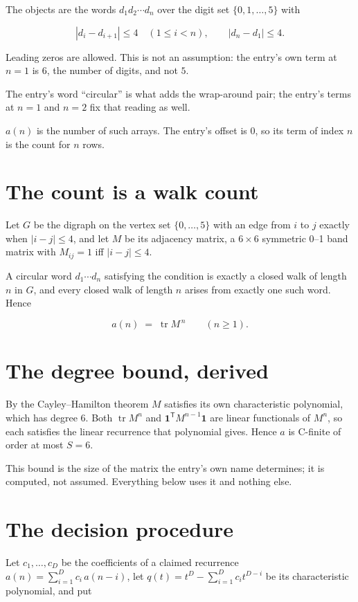 \documentclass[11pt]{article}
\theoremstyle{definition}
\begin{document}
The objects are the words $d_1 d_2 \cdots d_n$ over the digit set $\{0,1,\dots,5\}$ with

\[|d_i - d_{i+1}| \le 4\quad (1 \le i < n), \qquad |d_n - d_1| \le 4.\]

Leading zeros are allowed. This is not an assumption: the entry's own term at $n=1$ is $6$, the number of digits, and not $5$.

The entry's word ``circular'' is what adds the wrap-around pair; the entry's terms at $n = 1$ and $n = 2$ fix that reading as well.

$a(n)$ is the number of such arrays. The entry's offset is 0, so its term of index $n$ is the count for $n$ rows.

\section{The count is a walk count}

Let $G$ be the digraph on the vertex set $\{0,\dots,5\}$ with an edge from $i$ to $j$ exactly when $|i-j| \le 4$, and let $M$ be its adjacency matrix, a $6 \times 6$ symmetric 0--1 band matrix with $M_{ij} = 1$ iff $|i-j| \le 4$.

A circular word $d_1\cdots d_n$ satisfying the condition is exactly a closed walk of length $n$ in $G$, and every closed walk of length $n$ arises from exactly one such word. Hence

\[a(n) \;=\; \operatorname{tr} M^{\,n} \qquad (n \ge 1).\]

\section{The degree bound, derived}

By the Cayley--Hamilton theorem $M$ satisfies its own characteristic polynomial, which has degree $6$. Both $\operatorname{tr} M^n$ and $\mathbf 1^{\mathsf T} M^{n-1} \mathbf 1$ are linear functionals of $M^{n}$, so each satisfies the linear recurrence that polynomial gives. Hence $a$ is C-finite of order at most $S = 6$.

This bound is the size of the matrix the entry's own name determines; it is computed, not assumed. Everything below uses it and nothing else.

\section{The decision procedure}

Let $c_1,\dots,c_D$ be the coefficients of a claimed recurrence $a(n) = \sum_{i=1}^{D} c_i\,a(n-i)$, let $q(t) = t^{D} - \sum_{i=1}^{D} c_i t^{D-i}$ be its characteristic polynomial, and put
\end{document}
